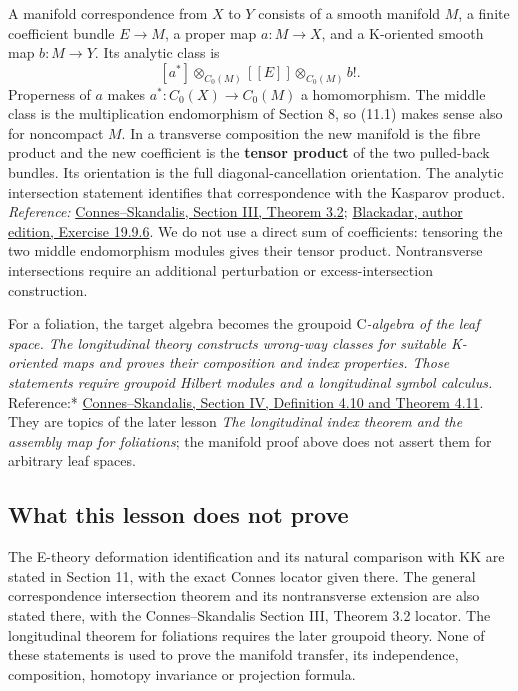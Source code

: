 \documentclass[
  11pt,
]{article}
\begin{document}
A manifold correspondence from \(X\) to \(Y\) consists of a smooth
manifold \(M\), a finite coefficient bundle \(E\to M\), a proper map
\(a:M\to X\), and a K-oriented smooth map \(b:M\to Y\). Its analytic
class is \[
 [a^*]\otimes_{C_0(M)}[[E]]\otimes_{C_0(M)}b!.
 \tag{11.1}
\] Properness of \(a\) makes \(a^*:C_0(X)\to C_0(M)\) a homomorphism.
The middle class is the multiplication endomorphism of Section 8, so
(11.1) makes sense also for noncompact \(M\). In a transverse
composition the new manifold is the fibre product and the new
coefficient is the \textbf{tensor product} of the two pulled-back
bundles. Its orientation is the full diagonal-cancellation orientation.
The analytic intersection statement identifies that correspondence with
the Kasparov product. \emph{Reference:}
\href{https://ems.press/content/serial-article-files/42241}{Connes--Skandalis,
Section III, Theorem 3.2};
\href{https://www.bruceblackadar.com/Mathematics/book6.pdf}{Blackadar,
author edition, Exercise 19.9.6}. We do not use a direct sum of
coefficients: tensoring the two middle endomorphism modules gives their
tensor product. Nontransverse intersections require an additional
perturbation or excess-intersection construction.

For a foliation, the target algebra becomes the groupoid C\emph{-algebra
of the leaf space. The longitudinal theory constructs wrong-way classes
for suitable K-oriented maps and proves their composition and index
properties. Those statements require groupoid Hilbert modules and a
longitudinal symbol calculus. }Reference:*
\href{https://ems.press/content/serial-article-files/42241}{Connes--Skandalis,
Section IV, Definition 4.10 and Theorem 4.11}. They are topics of the
later lesson \emph{The longitudinal index theorem and the assembly map
for foliations}; the manifold proof above does not assert them for
arbitrary leaf spaces.

\subsection{What this lesson does not
prove}\label{what-this-lesson-does-not-prove}

The E-theory deformation identification and its natural comparison with
KK are stated in Section 11, with the exact Connes locator given there.
The general correspondence intersection theorem and its nontransverse
extension are also stated there, with the Connes--Skandalis Section III,
Theorem 3.2 locator. The longitudinal theorem for foliations requires
the later groupoid theory. None of these statements is used to prove the
manifold transfer, its independence, composition, homotopy invariance or
projection formula.
\end{document}
